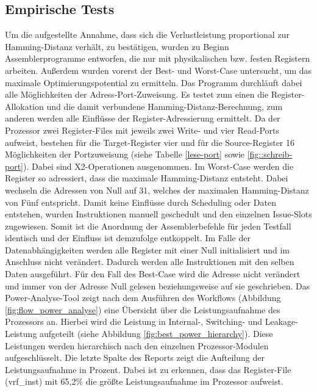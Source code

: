 \subsection{Empirische Tests}
\label{cap:empirischeTests}
Um die aufgestellte Annahme, dass sich die Verlustleistung proportional zur Hamming-Distanz verhält, zu bestätigen, wurden zu Beginn Assemblerprogramme entworfen, die nur mit physikalischen bzw. festen Registern arbeiten.
Außerdem wurden vorerst der Best- und Worst-Case untersucht, um das maximale Optimierungspotential zu ermitteln. Das Programm durchläuft dabei alle Möglichkeiten der Adress-Port-Zuweisung. Es testet zum einen die Register-Allokation und die damit verbundene Hamming-Distanz-Berechnung, zum anderen werden alle Einflüsse der Register-Adressierung ermittelt. Da der Prozessor zwei Register-Files mit jeweils zwei Write- und vier Read-Ports aufweist, bestehen für die Target-Register vier und für die Source-Register 16 Möglichkeiten der Portzuweisung (siehe Tabelle \ref{lese-port} sowie \ref{fig::schreib-port}). Dabei sind X2-Operationen ausgenommen. Im Worst-Case werden die Register so adressiert, dass die maximale Hamming-Distanz entsteht. Dabei wechseln die Adressen von Null auf 31, welches der maximalen Hamming-Distanz von Fünf entspricht. Damit keine Einflüsse durch Scheduling oder Daten entstehen, wurden Instruktionen manuell geschedult und den einzelnen Issue-Slots zugewiesen. Somit ist die Anordnung der Assemblerbefehle für jeden Testfall identisch und der Einfluss ist demzufolge entkoppelt. Im Falle der Datenabhängigkeiten werden alle Register mit einer Null initialisiert und im Anschluss nicht verändert. Dadurch werden alle Instruktionen mit den selben Daten ausgeführt.
Für den Fall des Best-Case wird die Adresse nicht verändert und immer von der Adresse Null gelesen beziehungsweise auf sie geschrieben.
Das Power-Analyse-Tool zeigt nach dem Ausführen des Workflows (Abbildung \ref{fig:flow_power_analyse}) eine Übersicht über die Leistungsaufnahme des Prozessors an. Hierbei wird die Leistung in Internal-, Switching- und Leakage-Leistung aufgeteilt (siehe Abbildung \ref{fig:best_power_hierarchy}).
Diese Leistungen werden hierarchisch nach den einzelnen Prozessor-Modulen aufgeschlüsselt. Die letzte Spalte des Reports zeigt die Aufteilung der Leistungsaufnahme in Prozent. Dabei ist zu erkennen, dass das Register-File (vrf\_inst) mit 65,2\% die größte Leistungsaufnahme im Prozessor aufweist.

